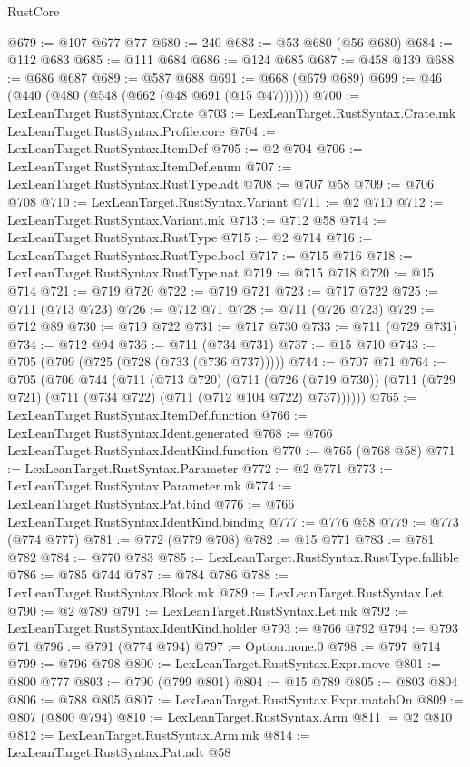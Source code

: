 \begin{lexlean}{RustCore}
\begin{coremodule}
@679 := @107 @677 @77
@680 := 240
@683 := @53 @680 (@56 @680)
@684 := @112 @683
@685 := @111 @684
@686 := @124 @685
@687 := @458 @139
@688 := @686 @687
@689 := @587 @688
@691 := @668 (@679 @689)
@699 := @46 (@440 (@480 (@548 (@662 (@48 @691 (@15 @47))))))
@700 := LexLeanTarget.RustSyntax.Crate
@703 := LexLeanTarget.RustSyntax.Crate.mk LexLeanTarget.RustSyntax.Profile.core
@704 := LexLeanTarget.RustSyntax.ItemDef
@705 := @2 @704
@706 := LexLeanTarget.RustSyntax.ItemDef.enum
@707 := LexLeanTarget.RustSyntax.RustType.adt
@708 := @707 @58
@709 := @706 @708
@710 := LexLeanTarget.RustSyntax.Variant
@711 := @2 @710
@712 := LexLeanTarget.RustSyntax.Variant.mk
@713 := @712 @58
@714 := LexLeanTarget.RustSyntax.RustType
@715 := @2 @714
@716 := LexLeanTarget.RustSyntax.RustType.bool
@717 := @715 @716
@718 := LexLeanTarget.RustSyntax.RustType.nat
@719 := @715 @718
@720 := @15 @714
@721 := @719 @720
@722 := @719 @721
@723 := @717 @722
@725 := @711 (@713 @723)
@726 := @712 @71
@728 := @711 (@726 @723)
@729 := @712 @89
@730 := @719 @722
@731 := @717 @730
@733 := @711 (@729 @731)
@734 := @712 @94
@736 := @711 (@734 @731)
@737 := @15 @710
@743 := @705 (@709 (@725 (@728 (@733 (@736 @737)))))
@744 := @707 @71
@764 := @705
    (@706
      @744
      (@711
        (@713 @720)
        (@711
          (@726 (@719 @730))
          (@711 (@729 @721) (@711 (@734 @722) (@711 (@712 @104 @722) @737))))))
@765 := LexLeanTarget.RustSyntax.ItemDef.function
@766 := LexLeanTarget.RustSyntax.Ident.generated
@768 := @766 LexLeanTarget.RustSyntax.IdentKind.function
@770 := @765 (@768 @58)
@771 := LexLeanTarget.RustSyntax.Parameter
@772 := @2 @771
@773 := LexLeanTarget.RustSyntax.Parameter.mk
@774 := LexLeanTarget.RustSyntax.Pat.bind
@776 := @766 LexLeanTarget.RustSyntax.IdentKind.binding
@777 := @776 @58
@779 := @773 (@774 @777)
@781 := @772 (@779 @708)
@782 := @15 @771
@783 := @781 @782
@784 := @770 @783
@785 := LexLeanTarget.RustSyntax.RustType.fallible
@786 := @785 @744
@787 := @784 @786
@788 := LexLeanTarget.RustSyntax.Block.mk
@789 := LexLeanTarget.RustSyntax.Let
@790 := @2 @789
@791 := LexLeanTarget.RustSyntax.Let.mk
@792 := LexLeanTarget.RustSyntax.IdentKind.holder
@793 := @766 @792
@794 := @793 @71
@796 := @791 (@774 @794)
@797 := Option.none.{0}
@798 := @797 @714
@799 := @796 @798
@800 := LexLeanTarget.RustSyntax.Expr.move
@801 := @800 @777
@803 := @790 (@799 @801)
@804 := @15 @789
@805 := @803 @804
@806 := @788 @805
@807 := LexLeanTarget.RustSyntax.Expr.matchOn
@809 := @807 (@800 @794)
@810 := LexLeanTarget.RustSyntax.Arm
@811 := @2 @810
@812 := LexLeanTarget.RustSyntax.Arm.mk
@814 := LexLeanTarget.RustSyntax.Pat.adt @58

\end{coremodule}
\end{lexlean}
